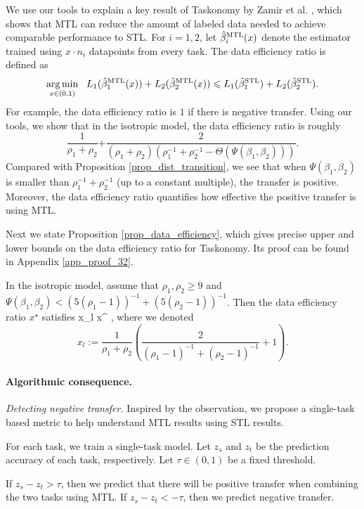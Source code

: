 We use our tools to explain a key result of Taskonomy by Zamir et al. \cite{ZSSGM18}, which shows that MTL can reduce the amount of labeled data needed to achieve comparable performance to STL.
For $i = 1, 2$, let $\hat{\beta}_i^{\textup{MTL}}(x)$ denote the estimator trained using $x \cdot n_i$ datapoints from every task. The data efficiency ratio is defined as
{\small\[ \operatorname*{arg\,min}_{x\in(0, 1)} ~~
		L_1(\hat{\beta}_1^{\textup{MTL}}(x)) + L_2(\hat{\beta}_2^{\textup{MTL}}(x))
		\leqslant L_1(\hat{\beta}_1^{\textup{STL}}) + L_2(\hat{\beta}_2^{\textup{STL}}). \]}
For example, the data efficiency ratio is $1$ if there is negative transfer.
Using our tools, we show that in the isotropic model, the data efficiency ratio is
roughly
{\small\[ \frac{1}{\rho_1 + \rho_2} {+ \frac{2}{(\rho_1 +\rho_2)(\rho_1^{-1} + \rho_2^{-1} - \Theta(\Psi(\beta_1, \beta_2)))}}. \]}%
Compared with Proposition \ref{prop_dist_transition}, we see that when $\Psi(\beta_1, \beta_2)$ is smaller than $\rho_1^{-1} + \rho_2^{-1}$ (up to a constant multiple), the transfer is positive.
Moreover, the data efficiency ratio quantifies how effective the positive transfer is using MTL.


Next we state Proposition \ref{prop_data_efficiency}, which gives precise upper and lower bounds on the data efficiency ratio for Taskonomy. Its proof can be found in Appendix \ref{app_proof_32}. %

\begin{proposition}
\label{prop_data_efficiency}
	In the isotropic model, assume that $\rho_1,\rho_2 \ge 9$ and $\Psi(\beta_1, \beta_2) < (5(\rho_1-1))^{-1} + (5(\rho_2-1))^{-1}$.
	Then the data efficiency ratio $x^\star$ satisfies
	\be\label{eq_uplowx} x_l  \le x^\star\le {} , \ee
	where we denoted
	$$x_l:= \frac1{\rho_1+\rho_2}\left(\frac{2}{(\rho_1-1)^{-1}+(\rho_2 -1)^{-1}}+1\right).$$
\end{proposition}

\paragraph{Algorithmic consequence.}

\noindent\textit{Detecting negative transfer.}
Inspired by the observation, we propose a single-task based metric to help understand MTL results using STL results.
\squishlist
	\item For each task, we train a single-task model.
	Let $z_s$ and $z_t$ be the prediction accuracy of each task, respectively.
	Let $\tau\in(0, 1)$ be a fixed threshold.
	\item If $z_s - z_t > \tau$, then we predict that there will be positive transfer when combining the two tasks using MTL.
	If $z_s - z_t < -\tau$, then we predict negative transfer.
\squishend


